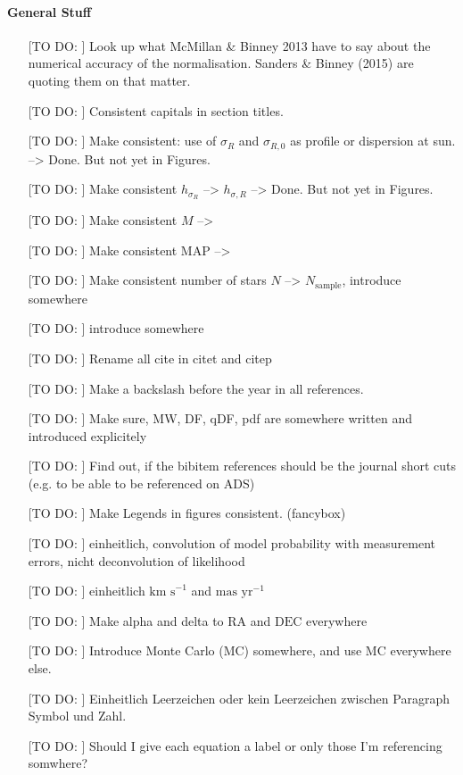 \paragraph{General Stuff}
\begin{itemize}
\item[[TO DO:]] Look up what McMillan \& Binney 2013 have to say about the numerical accuracy of the normalisation. Sanders \& Binney (2015) are quoting them on that matter.
\item[[TO DO:]] Consistent capitals in section titles.
\item[[TO DO:]] Make consistent: use of $\sigma_R$ and $\sigma_{R,0}$ as profile or dispersion at sun. --> Done. But not yet in Figures.
\item[[TO DO:]] Make consistent $h_{\sigma_R}$ --> $h_{\sigma,R}$ --> Done. But not yet in Figures.
\item[[TO DO:]] Make consistent $M$ --> \pmodel
\item[[TO DO:]] Make consistent MAP --> \MAP
\item[[TO DO:]] Make consistent number of stars $N$ --> $N_\text{sample}$, introduce somewhere
\item[[TO DO:]]  introduce \pdf somewhere
\item[[TO DO:]]  Rename all cite in citet and citep
\item[[TO DO:]] Make a backslash before the year in all references.
\item[[TO DO:]] Make sure, MW, DF, qDF, pdf are somewhere written and introduced explicitely
\item[[TO DO:]] Find out, if the bibitem references should be the journal short cuts (e.g. to be able to be referenced on ADS)
\item[[TO DO:]] Make Legends in figures consistent. (fancybox)
\item[[TO DO:]] einheitlich, convolution of model probability with measurement errors, nicht deconvolution of likelihood
\item[[TO DO:]] einheitlich $\text{km s}^{-1}$ and $\text{mas yr}^{-1}$
\item[[TO DO:]] Make alpha and delta to $\text{RA}$ and $\text{DEC}$ everywhere
\item[[TO DO:]] Introduce Monte Carlo (MC) somewhere, and use MC everywhere else.
\item[[TO DO:]] Einheitlich Leerzeichen oder kein Leerzeichen zwischen Paragraph Symbol und Zahl.
\item[[TO DO:]] Should I give each equation a label or only those I'm referencing somwhere?

\end{itemize}
